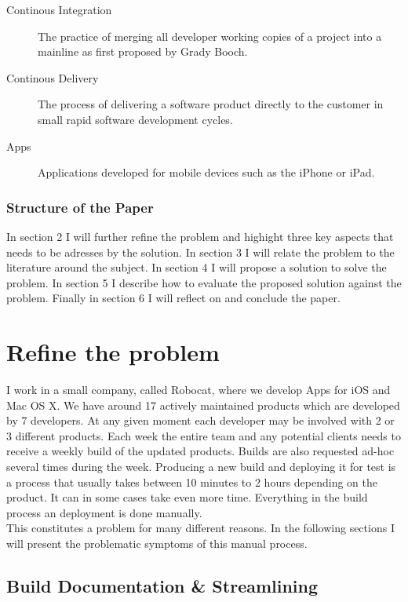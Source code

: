 \documentclass{ituthesis}
\begin{document}
\begin{description}
\item[Continous Integration] The practice of merging all developer working copies of a project into a mainline as first proposed by Grady Booch.
\item[Continous Delivery] The process of delivering a software product directly to the customer in small rapid software development cycles.
\item[Apps] Applications developed for mobile devices such as the iPhone or iPad.
\end{description}

\subsection{Structure of the Paper}

In section 2 I will further refine the problem and highight three key aspects that needs to be adresses by the solution. In section 3 I will relate the problem to the literature around the subject. In section 4 I will propose a solution to solve the problem. In section 5 I describe how to evaluate the proposed solution against the problem. Finally in section 6 I will reflect on and conclude the paper.

\chapter{Refine the problem}

I work in a small company, called Robocat, where we develop Apps for iOS and Mac OS X. We have around 17 actively maintained products which are developed by 7 developers. At any given moment each developer may be involved with 2 or 3 different products. Each week the entire team and any potential clients needs to receive a weekly build of the updated products. Builds are also requested ad-hoc several times during the week. Producing a new build and deploying it for test is a process that usually takes between 10 minutes to 2 hours depending on the product. It can in some cases take even more time. Everything in the build process an deployment is done manually.\\

This constitutes a problem for many different reasons. In the following sections I will present the problematic symptoms of this manual process.

\section{Build Documentation \& Streamlining}
\end{document}
